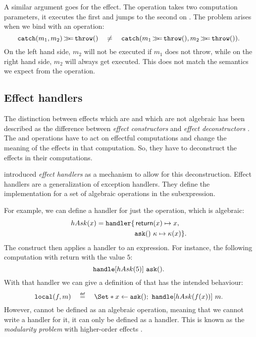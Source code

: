 A similar argument goes for the  effect. The \ocatch operation takes two computation parameters, it executes the first and jumps to the second on \othrow. The problem arises when we bind with an \othrow operation:
\[
    \mathtt{catch}(m_1, m_2) \operatorname{\mathtt{\gg\!\!=}} \mathtt{throw}() \quad\neq\quad \mathtt{catch}(m_1\operatorname{\mathtt{\gg\!\!=}}\mathtt{throw}(), m_2\operatorname{\mathtt{\gg\!\!=}}\mathtt{throw}()).
\]
On the left hand side, $m_2$ will not be executed if $m_1$ does not throw, while on the right hand side, $m_2$ will always get executed. This does not match the semantics we expect from the \ocatch operation.

\subsection{Effect handlers}

The distinction between effects which are and which are not algebraic has been described as the difference between \emph{effect constructors} and \emph{effect deconstructors} \autocite{plotkin_algebraic_2003}. The \olocal and \ocatch operations have to act on effectful computations and change the meaning of the effects in that computation. So, they have to deconstruct the effects in their computations.

\textcite{castagna_handlers_2009} introduced \emph{effect handlers} as a mechanism to allow for this deconstruction. Effect handlers are a generalization of exception handlers. They define the implementation for a set of algebraic operations in the subexpression.

For example, we can define a handler for just the \oask operation, which is algebraic:
\[
    hAsk(x) = \mathbf{\mathtt{handler}} \{
        \begin{aligned}[t]
            &\operatorname{\mathsf{return}}(x) \mapsto x, \\
            &\mathtt{ask}()\ \kappa \mapsto \kappa(x) \}.\\
        \end{aligned}
\]
The \handle construct then applies a handler to an expression. For instance, the following computation with return with the value $5$:
\[
    \mathbf{\mathtt{handle}}[hAsk(5)]\ \mathtt{ask}().
\]
With that handler we can give a definition of \olocal that has the intended behaviour:
\[
    \olocal(f, m) \quad\defeq\quad \S{x \gets \oask()\seq \handle[hAsk(f(x))]\ m}.
\]
However, \olocal cannot be defined as an algebraic operation, meaning that we cannot write a handler for it, it can only be defined as a handler. This is known as the \emph{modularity problem} with higher-order effects \autocite{wu_effect_2014}.

